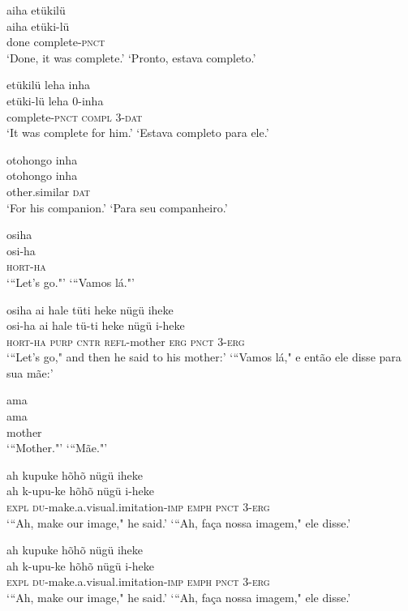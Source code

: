 \documentclass[output=paper,
modfonts,nonflat
]{langsci/langscibook}
\begin{document}
\ea  aiha etükilü\\[.3em]
\gll aiha etüki-lü\\
     done complete-\textsc{pnct}\\
\glt ‘Done, it was complete.’
\glt ‘Pronto, estava completo.’
\z

\ea  etükilü leha inha\\[.3em]
\gll etüki-lü leha 0-inha\\
     complete-\textsc{pnct} \textsc{compl} 3-\textsc{dat}\\
\glt ‘It was complete for him.’
\glt ‘Estava completo para ele.’
\z

\ea  otohongo inha\\[.3em]
\gll otohongo inha\\
     other.similar \textsc{dat}\\
\glt ‘For his companion.’
\glt ‘Para seu companheiro.’
\z

\ea  osiha\\[.3em]
\gll osi-ha\\
     \textsc{hort}-\textsc{ha}\\
\glt ‘“Let's go."’
\glt ‘“Vamos lá."’
\z

\ea  osiha ai hale tüti heke nügü iheke\\[.3em]
\gll osi-ha ai hale tü-ti heke nügü i-heke\\
     \textsc{hort}-\textsc{ha} \textsc{purp} \textsc{cntr} \textsc{refl}-mother \textsc{erg} \textsc{pnct} 3-\textsc{erg}\\
\glt ‘“Let's go," and then he said to his mother:’
\glt ‘“Vamos lá," e então ele disse para sua mãe:’
\z

\ea  ama\\[.3em]
\gll ama\\
     mother\\
\glt ‘“Mother."’
\glt ‘“Mãe."’
\z

\ea  ah kupuke hõhõ nügü iheke\\[.3em]
\gll ah k-upu-ke hõhõ nügü i-heke\\
     \textsc{expl} \textsc{du}-make.a.visual.imitation-\textsc{imp} \textsc{emph} \textsc{pnct} 3-\textsc{erg}\\
\glt ‘“Ah, make our image," he said.’
\glt ‘“Ah, faça nossa imagem," ele disse.’
\z

\ea  ah kupuke hõhõ nügü iheke\\[.3em]
\gll ah k-upu-ke hõhõ nügü i-heke\\
     \textsc{expl} \textsc{du}-make.a.visual.imitation-\textsc{imp} \textsc{emph} \textsc{pnct} 3-\textsc{erg}\\
\glt ‘“Ah, make our image," he said.’
\glt ‘“Ah, faça nossa imagem," ele disse.’
\z
\end{document}
